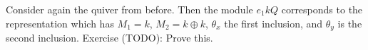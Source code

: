 Consider again the quiver from before. Then the module $e_1 kQ$ corresponds
to the representation which has $M_1 = k$, $M_2 = k\oplus k$, $\theta_x$
the first inclusion, and $\theta_y$ is the second inclusion.
Exercise (TODO): Prove this.

